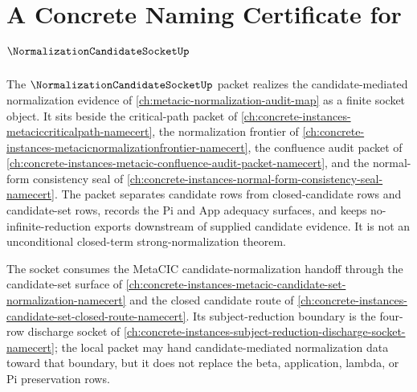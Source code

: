\chapter{A Concrete Naming Certificate for $\NormalizationCandidateSocketUp$}
\label{ch:concrete-instances-normalization-candidate-socket-namecert}

The $\NormalizationCandidateSocketUp$ packet realizes the candidate-mediated normalization evidence of \autoref{ch:metacic-normalization-audit-map} as a finite socket object. It sits beside the critical-path packet of \autoref{ch:concrete-instances-metaciccriticalpath-namecert}, the normalization frontier of \autoref{ch:concrete-instances-metacicnormalizationfrontier-namecert}, the confluence audit packet of \autoref{ch:concrete-instances-metacic-confluence-audit-packet-namecert}, and the normal-form consistency seal of \autoref{ch:concrete-instances-normal-form-consistency-seal-namecert}. The packet separates candidate rows from closed-candidate rows and candidate-set rows, records the Pi and App adequacy surfaces, and keeps no-infinite-reduction exports downstream of supplied candidate evidence. It is not an unconditional closed-term strong-normalization theorem.

The socket consumes the MetaCIC candidate-normalization handoff through the candidate-set surface of \autoref{ch:concrete-instances-metacic-candidate-set-normalization-namecert} and the closed candidate route of \autoref{ch:concrete-instances-candidate-set-closed-route-namecert}. Its subject-reduction boundary is the four-row discharge socket of \autoref{ch:concrete-instances-subject-reduction-discharge-socket-namecert}; the local packet may hand candidate-mediated normalization data toward that boundary, but it does not replace the beta, application, lambda, or Pi preservation rows.

